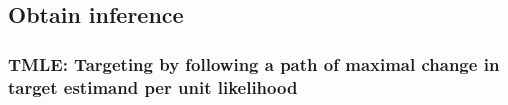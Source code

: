 \documentclass[t]{beamer}
\begin{document}



\subsection{Obtain inference}

\begin{frame}
\frametitle{TMLE: Targeting by following a path of maximal change in target estimand per unit likelihood}
\vspace{-13pt}
\centering
\begin{figure}
\centering
{}
\end{figure}
\end{frame}
\end{document}
